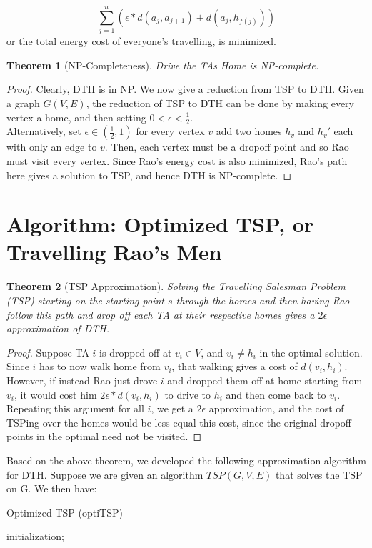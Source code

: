 \documentclass{article}
\newtheorem{theorem}{Theorem}[section]
\theoremstyle{definition}
\theoremstyle{remark}
\begin{document}
        $$\sum_{j = 1}^{n} \left( \epsilon * d(a_j, a_{j+1}) + d(a_j, h_{f(j)}) \right) $$ or the total energy cost of everyone's travelling, is minimized. 
         
        \begin{theorem}[NP-Completeness]
        	Drive the TAs Home is NP-complete.
       	\end{theorem}
     	\begin{proof}
     		Clearly, DTH is in NP.
     		We now give a reduction from TSP to DTH.
     		Given a graph $G(V, E)$, the reduction of TSP to DTH can be done by making every vertex a home, and then setting $0 < \epsilon < \frac{1}{2}$. \\
     		Alternatively, set $\epsilon \in (\frac{1}{2}, 1)$ for every vertex $v$ add two homes $h_v$ and $h_{v}'$ each with only an edge to $v$. Then, each vertex must be a dropoff point and so Rao must visit every vertex. Since Rao's energy cost is also minimized, Rao's path here gives a solution to TSP, and hence DTH is NP-complete.
     	\end{proof}	
      
         
\section{Algorithm: Optimized TSP, or Travelling Rao's Men}
		
		\begin{theorem}[TSP Approximation] 
			Solving the Travelling Salesman Problem (TSP) starting on the starting point $s$ through the homes and then having Rao follow this path and drop off each TA at their respective homes gives a $2 \epsilon$ approximation of DTH.
		\end{theorem}
		\begin{proof}
			Suppose TA $i$ is dropped off at $v_i \in V$, and $v_i \neq h_i$ in the optimal solution. Since $i$ has to now walk home from $v_i$, that walking gives a cost of $d(v_i, h_i)$. However, if instead Rao just drove $i$ and dropped them off at home starting from $v_i$, it would cost him $2 \epsilon * d(v_i, h_i)$ to drive to $h_i$ and then come back to $v_i$. Repeating this argument for all $i$, we get a $2 \epsilon$ approximation, and the cost of TSPing over the homes would be less equal this cost, since the original dropoff points in the optimal need not be visited. 
		\end{proof}
		
		Based on the above theorem, we developed the following approximation algorithm for DTH. Suppose we are given an algorithm $TSP(G, V, E)$ that solves the TSP on G. We then have: \\
		
		\begin{algorithm}[H]
			\caption{Optimized TSP (optiTSP)}
			\SetAlgoLined
				initialization;
		\end{algorithm} 
		
	
	
        
	
	
	
\end{document}

